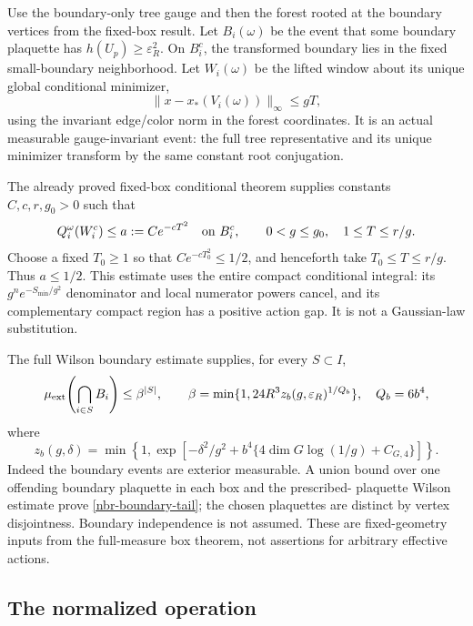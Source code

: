 \documentclass[11pt]{article}
\theoremstyle{remark}
\begin{document}
Use the boundary-only tree gauge and then the forest rooted at the
boundary vertices from the fixed-box result. Let \(B_i(\omega)\) be
the event that some boundary plaquette has
\(h(U_p)\ge\varepsilon_R^2\). On \(B_i^c\), the transformed boundary
lies in the fixed small-boundary neighborhood. Let \(W_i(\omega)\)
be the lifted window about its unique global conditional minimizer,
\begin{equation}
 \|x-x_*(V_i(\omega))\|_\infty\le gT,
 \label{nbr-window}
\end{equation}
using the invariant edge/color norm in the forest coordinates.
It is an actual measurable gauge-invariant event: the full tree
representative and its unique minimizer transform by the same constant
root conjugation.

The already proved fixed-box conditional theorem supplies constants
\(C,c,r,g_0>0\) such that
\begin{equation}
 Q_i^\omega(W_i^c)\le a:=Ce^{-cT^2}\quad\hbox{on }B_i^c,
 \qquad 0<g\le g_0,\quad 1\le T\le r/g.
 \label{nbr-conditional-tail}
\end{equation}
Choose a fixed \(T_0\ge1\) so that \(Ce^{-cT_0^2}\le1/2\), and
henceforth take \(T_0\le T\le r/g\). Thus \(a\le1/2\).
This estimate uses the entire compact conditional integral: its
\(g^n e^{-S_{\min}/g^2}\) denominator and local numerator powers
cancel, and its complementary compact region has a positive action
gap. It is not a Gaussian-law substitution.

The full Wilson boundary estimate supplies, for every \(S\subset I\),
\begin{equation}
 \mu_{\rm ext}\!\left(\bigcap_{i\in S}B_i\right)
 \le\beta^{|S|},\qquad
 \beta=\min\{1,24R^3z_b(g,\varepsilon_R)^{1/Q_b}\},
 \quad Q_b=6b^4,
 \label{nbr-boundary-tail}
\end{equation}
where
\[
 z_b(g,\delta)=\min\left\{1,
 \exp\left[-\delta^2/g^2+
 b^4\{4\dim G\log(1/g)+C_{G,4}\}\right]\right\}.
\]
Indeed the boundary events are exterior measurable. A union bound over
one offending boundary plaquette in each box and the prescribed-
plaquette Wilson estimate prove \eqref{nbr-boundary-tail}; the chosen
plaquettes are distinct by vertex disjointness. Boundary independence
is not assumed. These are fixed-geometry inputs from the full-measure
box theorem, not assertions for arbitrary effective actions.

\subsection{The normalized operation}
\label{nbr-operation-section}
\end{document}
